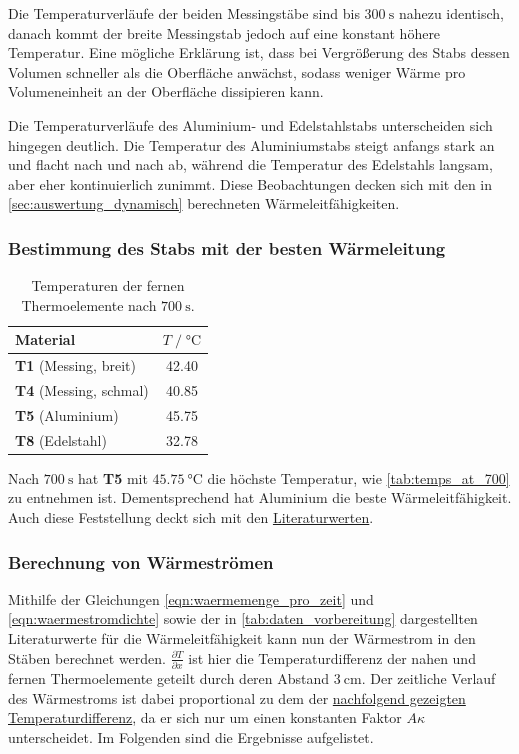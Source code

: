 Die Temperaturverläufe der beiden Messingstäbe sind bis $\SI{300}{\second}$ nahezu identisch,
danach kommt der breite Messingstab jedoch auf eine konstant höhere Temperatur.
Eine mögliche Erklärung ist,
dass bei Vergrößerung des Stabs dessen Volumen schneller als die Oberfläche anwächst,
sodass weniger Wärme pro Volumeneinheit an der Oberfläche dissipieren kann.

Die Temperaturverläufe des Aluminium- und Edelstahlstabs
unterscheiden sich hingegen deutlich.
Die Temperatur des Aluminiumstabs steigt anfangs stark an und flacht nach und nach ab,
während die Temperatur des Edelstahls langsam, aber eher kontinuierlich zunimmt.
Diese Beobachtungen decken sich mit den in \autoref{sec:auswertung_dynamisch} berechneten Wärmeleitfähigkeiten.


\subsubsection{Bestimmung des Stabs mit der besten Wärmeleitung}

\begin{table}[H]
  \centering
  \caption{Temperaturen der fernen Thermoelemente nach $\SI{700}{\second}$.}
  \label{tab:temps_at_700}
  \begin{tabular}{l c}
  \toprule
  Material &
  $T \;/\; \si{\celsius}$ \\
  \midrule
  \textbf{T1} (Messing, breit)  & \num{42.40} \\
  \textbf{T4} (Messing, schmal) & \num{40.85} \\
  \textbf{T5} (Aluminium)       & \num{45.75} \\
  \textbf{T8} (Edelstahl)       & \num{32.78} \\
  \bottomrule
  \end{tabular}
\end{table}

Nach $\SI{700}{\second}$ hat \textbf{T5} mit $\SI{45.75}{\celsius}$ die höchste Temperatur,
wie \autoref{tab:temps_at_700} zu entnehmen ist.
Dementsprechend hat Aluminium die beste Wärmeleitfähigkeit.
Auch diese Feststellung deckt sich mit den \hyperref[tab:daten_vorbereitung]{Literaturwerten}.


\subsubsection{Berechnung von Wärmeströmen}

Mithilfe der Gleichungen \eqref{eqn:waermemenge_pro_zeit} und \eqref{eqn:waermestromdichte}
sowie der in \autoref{tab:daten_vorbereitung} dargestellten Literaturwerte für die Wärmeleitfähigkeit
kann nun der Wärmestrom in den Stäben berechnet werden.
$\frac{\partial T}{\partial x}$ ist hier die Temperaturdifferenz der nahen und fernen Thermoelemente geteilt durch deren Abstand $\SI{3}{\centi\meter}$.
Der zeitliche Verlauf des Wärmestroms ist dabei proportional zu dem der \hyperref[fig:statisch_tdiff]{nachfolgend gezeigten Temperaturdifferenz},
da er sich nur um einen konstanten Faktor $A \kappa$ unterscheidet.
Im Folgenden sind die Ergebnisse aufgelistet.

